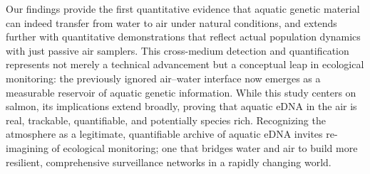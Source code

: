 \documentclass{article}
\begin{document}
Our findings provide the first quantitative evidence that aquatic genetic material can indeed transfer from water to air under natural conditions, and extends further with quantitative demonstrations that reflect actual population dynamics with just passive air samplers. This cross-medium detection and quantification represents not merely a technical advancement but a conceptual leap in ecological monitoring: the previously ignored air–water interface now emerges as a measurable reservoir of aquatic genetic information. While this study centers on salmon, its implications extend broadly, proving that aquatic eDNA in the air is real, trackable, quantifiable, and potentially species rich. Recognizing the atmosphere as a legitimate, quantifiable archive of aquatic eDNA invites re-imagining of ecological monitoring; one that bridges water and air to build more resilient, comprehensive surveillance networks in a rapidly changing world.


\end{document}
